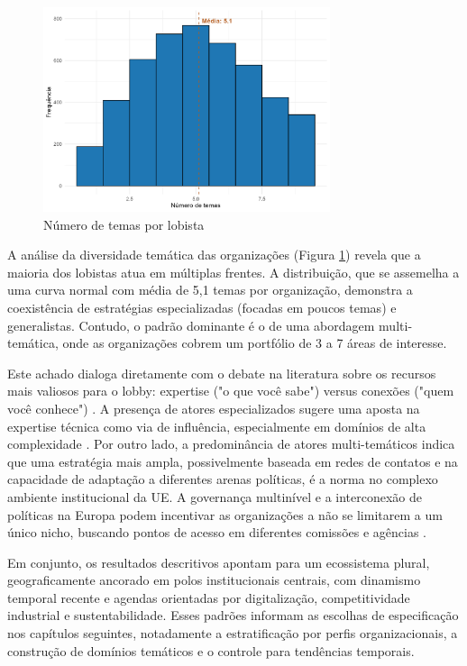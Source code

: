 \begin{figure}[!htbp]
\centering
\includegraphics[width=0.75\textwidth]{figures/descriptives_lobbyists/histogram_themes_per_lobbyist.png}
\caption{Número de temas por lobista}
\label{fig:themes_per_lobbyist_hist}
\end{figure}

A análise da diversidade temática das organizações (Figura \ref{fig:themes_per_lobbyist_hist}) revela que a maioria dos lobistas atua em múltiplas frentes. A distribuição, que se assemelha a uma curva normal com média de 5,1 temas por organização, demonstra a coexistência de estratégias especializadas (focadas em poucos temas) e generalistas. Contudo, o padrão dominante é o de uma abordagem multi-temática, onde as organizações cobrem um portfólio de 3 a 7 áreas de interesse.

Este achado dialoga diretamente com o debate na literatura sobre os recursos mais valiosos para o lobby: expertise ("o que você sabe") versus conexões ("quem você conhece") \cite{bertrand2014whom}. A presença de atores especializados sugere uma aposta na expertise técnica como via de influência, especialmente em domínios de alta complexidade \cite{kluver_informational_2012}. Por outro lado, a predominância de atores multi-temáticos indica que uma estratégia mais ampla, possivelmente baseada em redes de contatos e na capacidade de adaptação a diferentes arenas políticas, é a norma no complexo ambiente institucional da UE. A governança multinível e a interconexão de políticas na Europa podem incentivar as organizações a não se limitarem a um único nicho, buscando pontos de acesso em diferentes comissões e agências \cite{coen2019legislative}.

Em conjunto, os resultados descritivos apontam para um ecossistema plural, geograficamente ancorado em polos institucionais centrais, com dinamismo temporal recente e agendas orientadas por digitalização, competitividade industrial e sustentabilidade. Esses padrões informam as escolhas de especificação nos capítulos seguintes, notadamente a estratificação por perfis organizacionais, a construção de domínios temáticos e o controle para tendências temporais.


